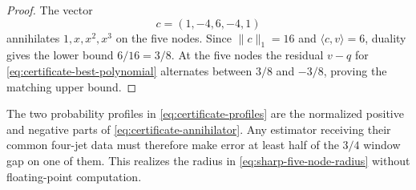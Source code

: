 \begin{proof}
The vector
\begin{equation}\label{eq:certificate-annihilator}
 c=(1,-4,6,-4,1)
\end{equation}
annihilates $1,x,x^2,x^3$ on the five nodes.  Since
$\|c\|_1=16$ and $\langle c,v\rangle=6$, duality gives the lower bound
$6/16=3/8$.  At the five nodes the residual $v-q$ for
\eqref{eq:certificate-best-polynomial} alternates between $3/8$ and
$-3/8$, proving the matching upper bound.
\end{proof}

The two probability profiles in \eqref{eq:certificate-profiles} are the
normalized positive and negative parts of
\eqref{eq:certificate-annihilator}.  Any estimator receiving their common
four-jet data must therefore make error at least half of the $3/4$ window
gap on one of them.  This realizes the radius in
\eqref{eq:sharp-five-node-radius} without floating-point computation.
